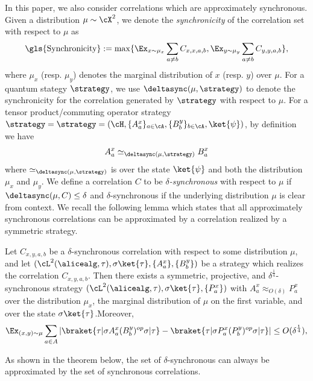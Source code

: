 In this paper, we also consider correlations which are approximately synchronous. Given a distribution $\mu \sim \cX^2$, we denote the \textit{synchronicity} of the correlation set with respect to $\mu$ as
\begin{equation} \label{eq:syncgame}
	\text{\gls{Synchronicity}} := \max\{\Ex_{x \sim \mu_x} \sum_{a \neq b} C_{x,x,a,b} , \Ex_{y \sim \mu_y} \sum_{a \neq b} C_{y,y,a,b}\}, 
\end{equation}
where $\mu_x$ (resp. $\mu_y$) denotes the marginal distribution of $x$  (resp. $y$) over $\mu$. For a quantum stategy $\strategy$, we use $\deltasync(\mu, \strategy)$ to denote the synchronicity for the correlation generated by $\strategy$ with respect to $\mu$. For a tensor product/commuting operator strategy $\strategy = \strategy= ( \cH, \{ A^x_a \}_{a \in \cA}, \{ B^y_b \}_{b \in \cA}, \ket{\psi})$, by definition we have 
\begin{equation} \label{eq:distancemeasuresyncstrategy}
 A^x_a \simeq_{\deltasync(\mu, \strategy)} B^x_a
\end{equation}
where $\simeq_{\deltasync(\mu, \strategy)}$ is over the state $\ket{\psi}$ and both the distribution $\mu_x$ and $\mu_y$. We define a correlation $C$ to be \textit{$\delta$-synchronous} with respect to $\mu$ if $\deltasync(\mu, C)  \leq \delta$ and $\delta$-synchronous if the underlying distribution $\mu$ is clear from context. We recall the following lemma which states that all approximately synchronous correlations can be approximated by a correlation realized by a symmetric strategy. 

\begin{corollary} \label{cor:orthogonalizationlemmasync}
	Let $C_{x,y,a,b}$ be a $\delta$-synchronous correlation with respect to some distribution $\mu$, and let $(\cL^2(\alicealg, \tau),\sigma \ket{\tau}, \{A_a^x \} , \{B_b^y\})$ be a strategy which realizes the correlation  $C_{x,y,a,b}$. Then there exists a symmetric, projective, and $\delta^{\frac{1}{4}}$-synchronous strategy $( \cL^2(\alicealg, \tau), \sigma \ket{\tau},\{ P_{a}^x \})$ with $A_a^x \approx_{ O(\delta)}  P^x_a$ over the distribution $\mu_x$, the marginal distribution of $\mu$ on the first variable, and over the state $\sigma \ket{\tau}$.Moreover,
	\begin{equation}\label{eq:orthogonalizationlemmasynceq}
		\Ex_{(x,y) \sim \mu} \sum_{a \in A} |\braket{\tau| \sigma A_a^x (B_b^y)^{op} \sigma |\tau} -\braket{\tau| \sigma P_a^x (P_b^y)^{op} \sigma |\tau}| \leq O(\delta^{\frac{1}{4}}),
	\end{equation} 
\end{corollary}
As shown in the theorem below, the set of $\delta$-synchronous can always be approximated by the set of synchronous correlations. 

